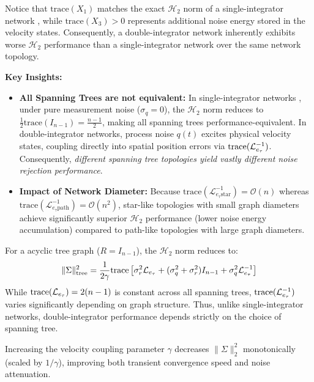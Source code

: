 \begin{remark}\label{rem:ch_RA_single_vs_double}
\leavevmode\par\noindent
Notice that $\text{trace}(X_1)$ matches the exact $\mathcal{H}_2$ norm of a single-integrator network \cite{zelazo2013performance}, while $\text{trace}(X_3) > 0$ represents additional noise energy stored in the velocity states. Consequently, a double-integrator network inherently exhibits worse $\mathcal{H}_2$ performance than a single-integrator network over the same network topology.
\end{remark}
\vspace{0.5em}
\noindent\textbf{Key Insights:}
\begin{itemize}
    \item \textbf{All Spanning Trees are not equivalent:} In single-integrator networks \cite{zelazo2013performance}, under pure measurement noise ($\sigma_q = 0$), the $\mathcal{H}_2$ norm reduces to $\frac{1}{2} \text{trace}(I_{n-1}) = \frac{n-1}{2}$, making all spanning trees performance-equivalent. In double-integrator networks, process noise $q(t)$ excites physical velocity states, coupling directly into spatial position errors via $\text{trace}(\mathcal{L}_{e_{\tau}}^{-1})$. Consequently, \emph{different spanning tree topologies yield vastly different noise rejection performance}.
    \item \textbf{Impact of Network Diameter:} Because $\text{trace}(\mathcal{L}_{e_\tau\text{star}}^{-1}) = \mathcal{O}(n)$ whereas $\text{trace}(\mathcal{L}_{e_\tau\text{path}}^{-1}) = \mathcal{O}(n^2)$, star-like topologies with small graph diameters achieve significantly superior $\mathcal{H}_2$ performance (lower noise energy accumulation) compared to path-like topologies with large graph diameters.
\end{itemize}
\begin{remark}\label{rem:ch_RA_tree_dependence}
For a acyclic tree graph ($R = I_{n-1}$), the $\mathcal{H}_2$ norm reduces to:
\begin{equation}\label{eq:ch_RA_tree_norm}
	\|\Sigma\|_{\text{tree}}^2 = \frac{1}{2\gamma} \text{trace}\left[ \sigma_r^2 \mathcal{L}_{e_{\tau}} + (\sigma_q^2 + \sigma_r^2) I_{n-1} + \sigma_q^2 \mathcal{L}_{e_{\tau}}^{-1} \right]
\end{equation}
While $\text{trace}(\mathcal{L}_{e_{\tau}}) = 2(n-1)$ is constant across all spanning trees, $\text{trace}(\mathcal{L}_{e_{\tau}}^{-1})$ varies significantly depending on graph structure. Thus, unlike single-integrator networks, double-integrator performance depends strictly on the choice of spanning tree.
\end{remark}
\begin{remark}\label{rem:ch_RA_gamma_impact}
Increasing the velocity coupling parameter $\gamma$ decreases $\|\Sigma\|_2^2$ monotonically (scaled by $1/\gamma$), improving both transient convergence speed and noise attenuation.
\end{remark}
